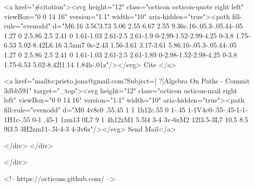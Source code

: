       <a  href="#citation"><svg height="12" class="octicon octicon-quote right left" viewBox="0 0 14 16" version="1.1" width="10" aria-hidden="true"><path fill-rule="evenodd" d="M6.16 3.5C3.73 5.06 2.55 6.67 2.55 9.36c.16-.05.3-.05.44-.05 1.27 0 2.5.86 2.5 2.41 0 1.61-1.03 2.61-2.5 2.61-1.9 0-2.99-1.52-2.99-4.25 0-3.8 1.75-6.53 5.02-8.42L6.16 3.5zm7 0c-2.43 1.56-3.61 3.17-3.61 5.86.16-.05.3-.05.44-.05 1.27 0 2.5.86 2.5 2.41 0 1.61-1.03 2.61-2.5 2.61-1.89 0-2.98-1.52-2.98-4.25 0-3.8 1.75-6.53 5.02-8.42l1.14 1.84h-.01z"/></svg> Cite
      </a>

      <a href="mailto:prieto.jona@gmail.com?Subject=[ ?]Algebra On Paths - Commit 3dbb591" target="_top"><svg height="12" class="octicon octicon-mail right left" viewBox="0 0 14 16" version="1.1" width="10" aria-hidden="true"><path fill-rule="evenodd" d="M0 4v8c0 .55.45 1 1 1h12c.55 0 1-.45 1-1V4c0-.55-.45-1-1-1H1c-.55 0-1 .45-1 1zm13 0L7 9 1 4h12zM1 5.5l4 3-4 3v-6zM2 12l3.5-3L7 10.5 8.5 9l3.5 3H2zm11-.5l-4-3 4-3v6z"/></svg> Send Mail</a>

    </div>
  </div>

</div>

<!-- https://octicons.github.com/ -->





